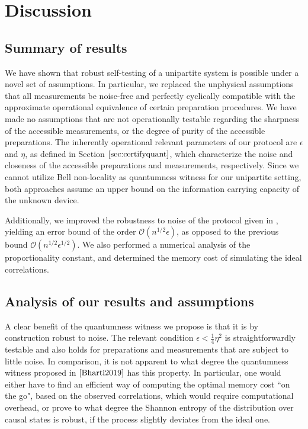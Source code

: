 \chapter{Discussion}
\label{sec:discussion}
\section{Summary of results}
We have shown that robust self-testing of a unipartite system is possible under a novel set of assumptions. In particular, we replaced the unphysical assumptions that all measurements be noise-free and perfectly cyclically compatible with the approximate operational equivalence of certain preparation procedures. We have made no assumptions that are not operationally testable regarding the sharpness of the accessible measurements, or the degree of purity of the accessible preparations. The inherently operational relevant parameters of our protocol are $\epsilon$ and $\eta$, as defined in Section $\ref{sec:certifyquant}$, which characterize the noise and closeness of the accessible preparations and measurements, respectively.
Since we cannot utilize Bell non-locality as quantumness witness for our unipartite setting, both approaches assume an upper bound on the information carrying capacity of the unknown device.

Additionally, we improved the robustness to noise of the protocol given in \citep{Bharti2019}, yielding an error bound of the order $\mathcal{O}\left(n^{1/2}\epsilon\right)$, as opposed to the previous bound $\mathcal{O}\left(n^{1/2}\epsilon^{1/2}\right)$. We also performed a numerical analysis of the proportionality constant, and determined the memory cost of simulating the ideal correlations.

\section{Analysis of our results and assumptions}

A clear benefit of the quantumness witness we propose is that it is by construction robust to noise. The relevant condition $\epsilon<\frac{1}{4}\eta^2$ is straightforwardly testable and also holds for preparations and measurements that are subject to little noise. In comparison, it is not apparent to what degree the quantumness witness proposed in $\cite{Bharti2019}$ has this property. In particular, one would either have to find an efficient way of computing the optimal memory cost ``on the go", based on the observed correlations, which would require computational overhead, or prove to what degree the Shannon entropy of the distribution over causal states is robust, if the process slightly deviates from the ideal one.

